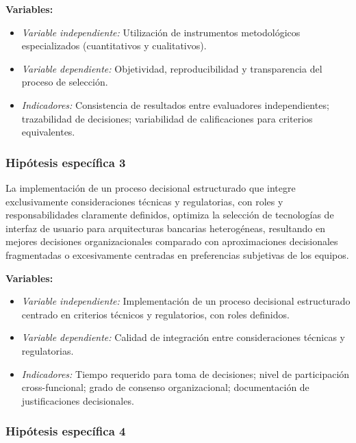         \textbf{Variables:}
        \begin{itemize}
          \item \textit{Variable independiente:} Utilización de instrumentos
                metodológicos especializados (cuantitativos y cualitativos).
          \item \textit{Variable dependiente:} Objetividad, reproducibilidad y
                transparencia del proceso de selección.
          \item \textit{Indicadores:} Consistencia de resultados entre
                evaluadores independientes; trazabilidad de decisiones;
                variabilidad de calificaciones para criterios equivalentes.
        \end{itemize}


\subsubsection{Hipótesis específica 3}

La implementación de un proceso decisional estructurado que integre
        exclusivamente consideraciones técnicas y regulatorias, con roles y
        responsabilidades claramente definidos, optimiza la selección de
        tecnologías de interfaz de usuario para arquitecturas bancarias
        heterogéneas, resultando en mejores decisiones organizacionales
        comparado con aproximaciones decisionales fragmentadas o
        excesivamente centradas en preferencias subjetivas de los equipos.

        \textbf{Variables:}
        \begin{itemize}
          \item \textit{Variable independiente:} Implementación de un proceso
                decisional estructurado centrado en criterios técnicos y
                regulatorios, con roles definidos.
          \item \textit{Variable dependiente:} Calidad de integración entre
                consideraciones técnicas y regulatorias.
          \item \textit{Indicadores:} Tiempo requerido para toma de decisiones;
                nivel de participación cross-funcional; grado de consenso
                organizacional; documentación de justificaciones decisionales.
        \end{itemize}


\subsubsection{Hipótesis específica 4}

